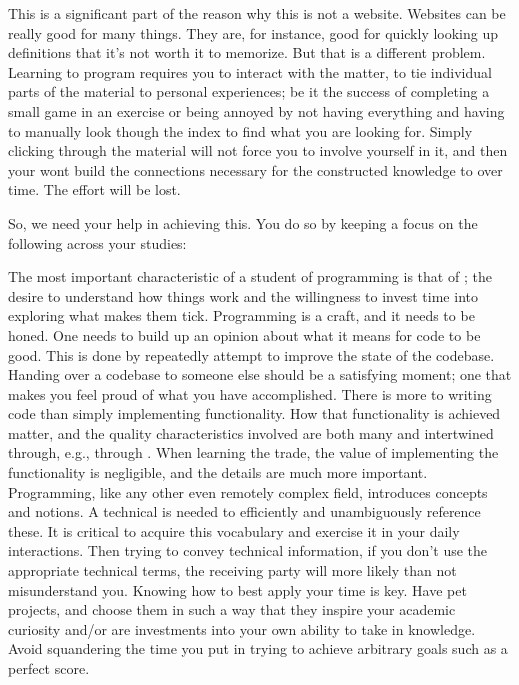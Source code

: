 This is a significant part of the reason why this is not a website. Websites can be really good for many things. They are, for instance, good for quickly looking up definitions that it's not worth it to memorize. But that is a different problem. Learning to program requires you to interact with the matter, to tie individual parts of the material to personal experiences; be it the success of completing a small game in an exercise or being annoyed by not having everything  and having to manually look though the index to find what you are looking for. Simply clicking through the material will not force you to involve yourself in it, and then your  wont build the connections necessary for the constructed knowledge to  over time. The effort will be lost.

So, we need your help in achieving this. You do so by keeping a focus on the following across your studies:
\begin{enumerate}
	 The most important characteristic of a student of programming is that of ; the desire to understand how things work and the willingness to invest time into exploring what makes them tick.
	 Programming is a craft, and it needs to be honed. One needs to build up an opinion about what it means for code to be good. This is done by repeatedly attempt to improve the state of the codebase. Handing over a codebase to someone else should be a satisfying moment; one that makes you feel proud of what you have accomplished.
	 There is more to writing code than simply implementing functionality. How that functionality is achieved matter, and the quality characteristics involved are both many and intertwined through, e.g., through . When learning the trade, the value of implementing the functionality is negligible, and the details are much more important.
	 Programming, like any other even remotely complex field, introduces concepts and notions. A technical  is needed to efficiently and unambiguously reference these. It is critical to acquire this vocabulary and exercise it in your daily interactions. Then trying to convey technical information, if you don't use the appropriate technical terms, the receiving party will more likely than not misunderstand you.
	 Knowing how to best apply your time is key. Have pet projects, and choose them in such a way that they inspire your academic curiosity and/or are investments into your own ability to take in knowledge. Avoid squandering the time you put in trying to achieve arbitrary goals such as a perfect score.
\end{enumerate}

